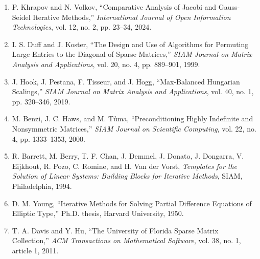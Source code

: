 \documentclass[11pt,a4paper]{article}
\begin{document}
\begin{enumerate}[leftmargin=1.2cm,itemsep=0.4em]
  \item P. Khrapov and N. Volkov, ``Comparative Analysis of Jacobi and Gauss-Seidel
  Iterative Methods,'' \emph{International Journal of Open Information Technologies},
  vol. 12, no. 2, pp. 23--34, 2024.
  \item I. S. Duff and J. Koster, ``The Design and Use of Algorithms for Permuting Large
  Entries to the Diagonal of Sparse Matrices,'' \emph{SIAM Journal on Matrix Analysis and
  Applications}, vol. 20, no. 4, pp. 889--901, 1999.
  \item J. Hook, J. Pestana, F. Tisseur, and J. Hogg, ``Max-Balanced Hungarian Scalings,''
  \emph{SIAM Journal on Matrix Analysis and Applications}, vol. 40, no. 1, pp. 320--346,
  2019.
  \item M. Benzi, J. C. Haws, and M. T\r{u}ma, ``Preconditioning Highly Indefinite and
  Nonsymmetric Matrices,'' \emph{SIAM Journal on Scientific Computing}, vol. 22, no. 4, pp.
  1333--1353, 2000.
  \item R. Barrett, M. Berry, T. F. Chan, J. Demmel, J. Donato, J. Dongarra, V. Eijkhout,
  R. Pozo, C. Romine, and H. Van der Vorst, \emph{Templates for the Solution of Linear
  Systems: Building Blocks for Iterative Methods}, SIAM, Philadelphia, 1994.
  \item D. M. Young, ``Iterative Methods for Solving Partial Difference Equations of
  Elliptic Type,'' Ph.D. thesis, Harvard University, 1950.
  \item T. A. Davis and Y. Hu, ``The University of Florida Sparse Matrix Collection,''
  \emph{ACM Transactions on Mathematical Software}, vol. 38, no. 1, article 1, 2011.
\end{enumerate}
\end{document}
